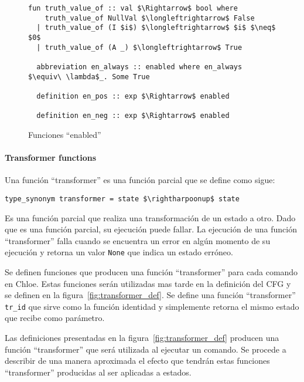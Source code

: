 \begin{figure}
  \begin{lstlisting}[frame=single, mathescape=true]
  fun truth_value_of :: val $\Rightarrow$ bool where
    truth_value_of NullVal $\longleftrightarrow$ False
  | truth_value_of (I $i$) $\longleftrightarrow$ $i$ $\neq$ $0$
  | truth_value_of (A _) $\longleftrightarrow$ True

  abbreviation en_always :: enabled where en_always $\equiv\ \lambda$_. Some True

  definition en_pos :: exp $\Rightarrow$ enabled

  definition en_neg :: exp $\Rightarrow$ enabled
  \end{lstlisting}

  \caption{Funciones ``enabled''}
  \label{fig:enabled_def}
\end{figure}


\paragraph*{Transformer functions}\label{paragraph:transformer}

Una función ``transformer'' es una función parcial que se define como sigue:

\begin{lstlisting}[mathescape=true, frame=single]
type_synonym transformer = state $\rightharpoonup$ state
\end{lstlisting}

Es una función parcial que realiza una transformación de un estado a otro.
Dado que es una función parcial, su ejecución puede fallar.
La ejecución de una función ``transformer'' falla cuando se encuentra un error en algún momento de su ejecución y retorna un valor \verb|None| que indica un estado erróneo.

Se definen funciones que producen una función ``transformer'' para cada comando en Chloe.
Estas funciones serán utilizadas mas tarde en la definición del CFG y se definen en la figura~\ref{fig:transformer_def}.
Se define una función ``transformer'' \verb|tr_id| que sirve como la función identidad y simplemente retorna el mismo estado que recibe como parámetro.

Las definiciones presentadas en la figura~\ref{fig:transformer_def} producen una función ``transformer'' que será utilizada al ejecutar un comando.
Se procede a describir de una manera aproximada el efecto que tendrán estas funciones ``transformer'' producidas al ser aplicadas a estados.

